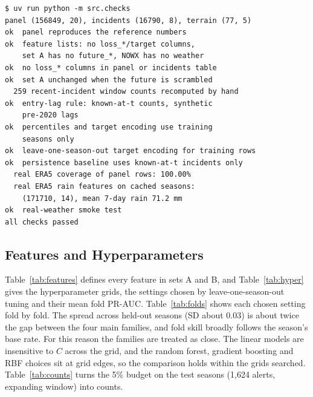 \documentclass[conference]{IEEEtran}
\begin{document}
\begin{table}[!t]
\caption{Clean run of the five notebooks.}
\label{tab:runtimes}
\centering
\scriptsize

\end{table}

{\scriptsize
\begin{verbatim}
$ uv run python -m src.checks
panel (156849, 20), incidents (16790, 8), terrain (77, 5)
ok  panel reproduces the reference numbers
ok  feature lists: no loss_*/target columns,
    set A has no future_*, NOWX has no weather
ok  no loss_* columns in panel or incidents table
ok  set A unchanged when the future is scrambled
  259 recent-incident window counts recomputed by hand
ok  entry-lag rule: known-at-t counts, synthetic
    pre-2020 lags
ok  percentiles and target encoding use training
    seasons only
ok  leave-one-season-out target encoding for training rows
ok  persistence baseline uses known-at-t incidents only
  real ERA5 coverage of panel rows: 100.00%
  real ERA5 rain features on cached seasons:
    (171710, 14), mean 7-day rain 71.2 mm
ok  real-weather smoke test
all checks passed
\end{verbatim}
}

\subsection{Features and Hyperparameters}
Table~\ref{tab:features} defines every feature in sets A and B, and Table~\ref{tab:hyper} gives the hyperparameter grids, the settings chosen by leave-one-season-out tuning and their mean fold PR-AUC. Table~\ref{tab:folds} shows each chosen setting fold by fold. The spread across held-out seasons (SD about 0.03) is about twice the gap between the four main families, and fold skill broadly follows the season's base rate. For this reason the families are treated as close. The linear models are insensitive to $C$ across the grid, and the random forest, gradient boosting and RBF choices sit at grid edges, so the comparison holds within the grids searched. Table~\ref{tab:counts} turns the 5\% budget on the test seasons (1,624 alerts, expanding window) into counts.
\begin{table}[!t]
\caption{Feature sets. Set A is the first five groups, set B adds the last group, and NOWX drops the rain group.}
\label{tab:features}
\centering
\scriptsize

\end{table}

\begin{table}[!t]
\caption{Hyperparameter grids, chosen settings and mean leave-one-season-out PR-AUC (2017 to 2022, set A).}
\label{tab:hyper}
\centering
\scriptsize

\end{table}
\end{document}
